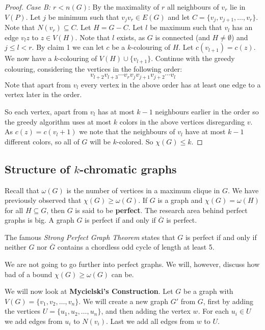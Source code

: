 \begin{proof}
	\noindent
	\textit{Case B: $r < n(G)$}: By the maximality of $r$ all neighbours of $v_{r}$ lie in $V(P)$. Let $j$ be minimum such that $v_{j}v_{r} \in E(G)$ and let $C = \{v_{j},v_{j+1}, \ldots, v_{r}\}$. Note that $N(v_{r}) \subseteq C$. Let $H = G - C$. Let $l$ be maximum such that $v_{l}$ has an edge $v_{l}z$ to $z \in V(H)$. Note that $l$ exists, as $G$ is connected (and $H \ne \emptyset$) and $j \le l < r$. By claim 1 we can let $c$ be a $k$-colouring of $H$. Let $c(v_{l+1}) = c(z)$. We now have a $k$-colouring of $V(H) \cup \{v_{l+1}\}$. Continue with the greedy colouring, considering the vertices in the following order:
	\[
		v_{l+2}v_{l+3} \cdots v_{r}v_{j}v_{j+1}v_{j+2} \cdots v_{l}
	\]
	Note that apart from $v_{l}$ every vertex in the above order has at least one edge to a vertex later in the order.

	So each vertex, apart from $v_{l}$ has at most $k-1$ neighbours  earlier in the order so the greedy algorithm uses at most $k$ colors in the above vertices disregarding $v$. As $c(z) = c(v_{l}+1)$ we note that the neighbours of $v_{l}$ have at most $k-1$ different  colors, so all of $G$ will be $k$-colored. So $\chi(G) \le k$.
\end{proof}


\subsection{Structure of $k$-chromatic graphs}%
\label{subsec:label}

Recall that $\omega(G)$ is the number of vertices in a maximum clique in $G$. We have previously observed that $\chi(G) \ge \omega(G)$. If $G$ is a graph and $\chi(G) = \omega(H)$ for all $H \subseteq G$, then $G$ is said to be \textbf{perfect}. The research area behind perfect graphs is big. A graph $G$ is perfect if and only if $\overline{G}$ is perfect.

The famous \textit{Strong Perfect Graph Theorem} states that $G$ is perfect if and only if neither $G$ nor $\overline{G}$ contains a chordless odd cycle of length at least 5.

We are not going to go further into perfect graphs. We will, however, discuss how bad of a bound $\chi(G) \ge \omega(G)$ can be.

We will now look at \textbf{Mycielski's Construction}. Let $G$ be a graph with $V(G) = \{v_{1}, v_{2}, \ldots, v_{n}\}$. We will create a new graph $G'$ from $G$, first by adding the vertices $U = \{u_{1}, u_{2}, \ldots, u_{n}\}$, and then adding the vertex $w$. For each $u_{i} \in U$ we add edges from $u_{i}$ to $N(v_{i})$. Last we add all edges from $w$ to $U$.

